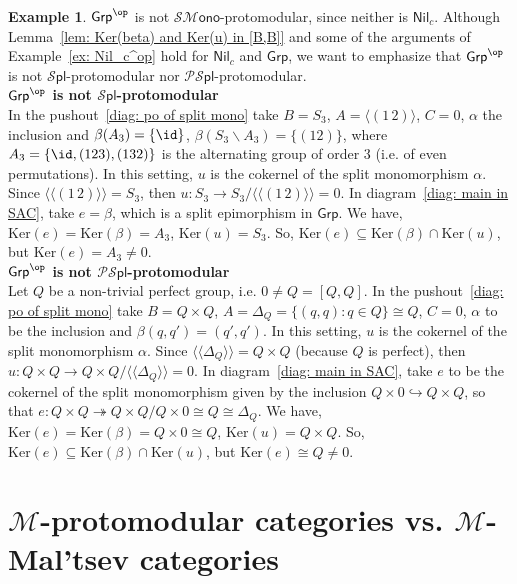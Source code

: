 \documentclass[10pt,a4paper]{amsart}
\theoremstyle{plain}
\theoremstyle{definition}
\newtheorem{example}[subsection]{Example}
\theoremstyle{remark}
\newcommand{\Grp}{\ensuremath{\mathsf{Grp}}}
\newcommand{\Nil}{\ensuremath{\mathsf{Nil}}}
\newcommand{\M}{\ensuremath{\mathscr{M}}}
\newcommand{\la}{\langle}
\newcommand{\ra}{\rangle}
\newcommand{\SMono}{\ensuremath{\mathscr{SM}\mathsf{ono}}}
\newcommand{\Spl}{\ensuremath{\mathscr{S}\mathsf{pl}}}
\newcommand{\PSpl}{\ensuremath{\mathscr{PS}\mathsf{pl}}}
\newcommand{\Ker}{\ensuremath{\mathrm{Ker}}}
\begin{document}
\begin{example}\label{ex: Grp^op} $\Grp^\op$ is not $\SMono$-protomodular, since neither is $\Nil_c$. Although Lemma~\ref{lem: Ker(beta) and Ker(u) in [B,B]} and some of the arguments of Example~\ref{ex: Nil_c^op} hold for $\Nil_c$ and $\Grp$, we want to emphasize that $\Grp^\op$ is not $\Spl$-protomodular nor $\PSpl$-protomodular. \\
\noindent\textbf{$\Grp^\op$ is not $\Spl$-protomodular}\\
In the pushout~\eqref{diag: po of split mono} take $B=S_3$, $A=\la (1\, 2)\ra$, $C=0$, $\alpha$ the inclusion and $\beta(A_3)=\{\id\}$, $\beta(S_3\backslash A_3)=\{(12)\}$, where $A_3=\{\id, (123),(132)\}$ is the alternating group of order 3 (i.e. of even permutations). In this setting, $u$ is the cokernel of the split monomorphism $\alpha$. Since $\la\la (1\,2)\ra\ra=S_3$, then $u\colon S_3\to S_3/\la\la (1\,2)\ra\ra=0$. In diagram~\eqref{diag: main in SAC}, take $e=\beta$, which is a split epimorphism in $\Grp$. We have, $\Ker(e)=\Ker(\beta)=A_3$, $\Ker(u)=S_3$. So, $\Ker(e)\subseteq \Ker(\beta)\cap \Ker(u)$, but $\Ker(e)=A_3\neq 0$.\\
\noindent\textbf{$\Grp^\op$ is not $\PSpl$-protomodular}\\
Let $Q$ be a non-trivial perfect group, i.e. $0\neq Q=[Q,Q]$. In the pushout~\eqref{diag: po of split mono} take $B=Q\times Q$, $A=\Delta_Q=\{(q,q):q\in Q\}\cong Q$, $C=0$, $\alpha$ to be the inclusion and $\beta(q,q')=(q',q')$. In this setting, $u$ is the cokernel of the split monomorphism $\alpha$. Since $\la\la \Delta_Q\ra\ra=Q\times Q$ (because $Q$ is perfect), then $u\colon Q\times Q\to Q\times Q/\la\la \Delta_Q\ra\ra=0$. In diagram~\eqref{diag: main in SAC}, take $e$ to be the cokernel of the split monomorphism given by the inclusion $Q\times 0 \hookrightarrow Q\times Q$, so that $e\colon Q\times Q \twoheadrightarrow Q\times Q/Q\times 0\cong Q\cong \Delta_Q$. We have, $\Ker(e)=\Ker(\beta)= Q\times 0\cong Q$, $\Ker(u)=Q\times Q$. So, $\Ker(e)\subseteq \Ker(\beta)\cap \Ker(u)$, but $\Ker(e)\cong Q\neq 0$.
\end{example}

\section{$\M$-protomodular categories vs. $\M$-Mal'tsev categories}\label{sec: M-proto vs M-Mal'tsev}
\end{document}
